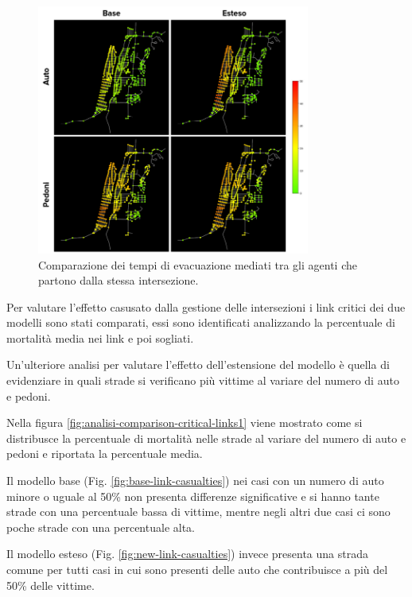 \begin{figure}[ht]
    \centering
    \includegraphics[width=0.8\textwidth]{images/analisi/comparison-evtimes-map.png}
    \caption{Comparazione dei tempi di evacuazione mediati tra gli agenti che partono dalla stessa intersezione. }
    \label{fig:analisi-comparison-ev-times-map}
\end{figure}

\pagebreak

Per valutare l'effetto casusato dalla gestione delle intersezioni i link critici dei due modelli sono stati comparati,
essi sono identificati analizzando la percentuale di mortalità media nei link e poi sogliati.

Un'ulteriore analisi per valutare l'effetto dell'estensione del modello è quella di evidenziare in quali strade si verificano 
più vittime al variare del numero di auto e pedoni. 

Nella figura \ref{fig:analisi-comparison-critical-links1} viene mostrato come si distribusce la percentuale di mortalità nelle strade 
al variare del numero di auto e pedoni e riportata la percentuale media. 

Il modello base (Fig. \ref{fig:base-link-casualties}) nei casi con un numero di auto minore o uguale al 50\%
non presenta differenze significative e si hanno tante strade con una percentuale bassa di vittime, 
mentre negli altri due casi ci sono poche strade con una percentuale alta.

Il modello esteso (Fig. \ref{fig:new-link-casualties}) invece presenta una strada comune per tutti casi 
in cui sono presenti delle auto che contribuisce a più del 50\% delle vittime.

